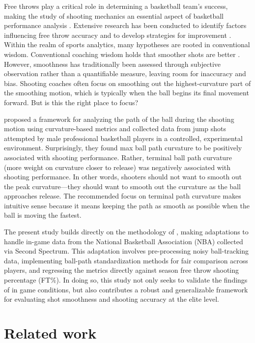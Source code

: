 \documentclass[Review,sageh,times,doublespace]{sagej}
\begin{document}
    Free throws play a critical role in determining a basketball team's success, making the study of shooting mechanics an essential aspect of basketball performance analysis \citep{kozar_importance_1994}. Extensive research has been conducted to identify factors influencing free throw accuracy and to develop strategies for improvement \citep{tran_optimal_2008}. Within the realm of sports analytics, many hypotheses are rooted in conventional wisdom. Conventional coaching wisdom holds that smoother shots are better \citep{haefner_7_2010, penny_overlooked_2016}. However, smoothness has traditionally been assessed through subjective observation rather than a quantifiable measure, leaving room for inaccuracy and bias. Shooting coaches often focus on smoothing out the highest-curvature part of the smoothing motion, which is typically when the ball begins its final movement forward. But is this the right place to focus?
    
    \citet{slegers_role_2024} proposed a framework for analyzing the path of the ball during the shooting motion using curvature-based metrics and collected data from jump shots attempted by male professional basketball players in a controlled, experimental environment. Surprisingly, they found max ball path curvature to be positively associated with shooting performance. Rather, terminal ball path curvature (more weight on curvature closer to release) was negatively associated with shooting performance. In other words, shooters should not want to smooth out the peak curvature---they should want to smooth out the curvature as the ball approaches release. The recommended focus on terminal path curvature makes intuitive sense because it means keeping the path as smooth as possible when the ball is moving the fastest.

    The present study builds directly on the methodology of \citet{slegers_role_2024}, making adaptations to handle in-game data from the National Basketball Association (NBA) collected via Second Spectrum. This adaptation involves pre-processing noisy ball-tracking data, implementing ball-path standardization methods for fair comparison across players, and regressing the metrics directly against season free throw shooting percentage (FT\%). In doing so, this study not only seeks to validate the findings of \citet{slegers_role_2024} in game conditions, but also contributes a robust and generalizable framework for evaluating shot smoothness and shooting accuracy at the elite level.

  \section{Related work}
  
\end{document}
